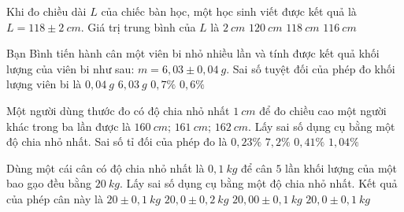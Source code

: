 \begin{ex}%
Khi đo chiều dài $L$ của chiếc bàn học, một học sinh viết được kết quả là $L=118 \pm 2\ cm$. Giá trị trung bình của $L$ là
\choice
{$2\ cm$}
{$120\ cm$}
{\True $118\ cm$}
{$116\ cm$}
\loigiai{
}
\end{ex}
\begin{ex}%
Bạn Bình tiến hành cân một viên bi nhỏ nhiều lần và tính được kết quả khối lượng của viên bi như sau: $m=6,03 \pm 0,04\ g$. Sai số tuyệt đối của phép đo khối lượng viên bi là
\choice
{\True $0,04\ g$}
{$6,03\ g$}
{$0,7\%$}
{$0,6\%$}
\loigiai{
}
\end{ex}
\begin{ex}%
Một người dùng thước đo có độ chia nhỏ nhất $1\ cm$ để đo chiều cao một người khác trong ba lần được là $160\ cm$; $161\ cm$; $162\ cm$. Lấy sai số dụng cụ bằng một độ chia nhỏ nhất. Sai số tỉ đối của phép đo là
\choice
{$0,23\%$}
{$7,2\%$}
{$0,41\%$}
{\True $1,04\%$}
\end{ex}
\begin{ex}%
Dùng một cái cân có độ chia nhỏ nhất là $0,1\ kg$ để cân $5$ lần khối lượng của một bao gạo đều bằng $20\ kg$. Lấy sai số dụng cụ bằng một độ chia nhỏ nhất. Kết quả của phép cân này là
\choice
{$20\pm 0,1\ kg$}
{$20,0\pm 0,2\ kg$}
{$20,00\pm 0,1\ kg$}
{\True $20,0\pm 0,1\ kg$}
\end{ex}
